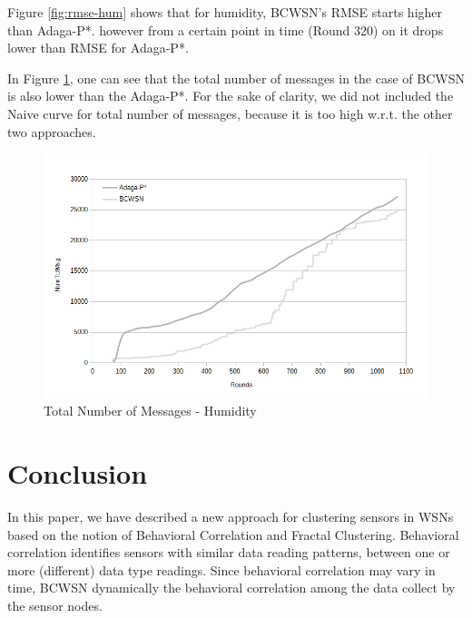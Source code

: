 \documentclass{acm_proc_article-sp}
\begin{document}
Figure \ref{fig:rmse-hum} shows that for 
humidity, BCWSN's RMSE  starts higher than Adaga-P*. however from a certain 
point in time (Round 320) on it drops lower than RMSE for Adaga-P*.

In Figure \ref{fig:tot-num-msg-hum}, one can see that the total number of messages 
in the case of BCWSN is also lower than the Adaga-P*. For the sake of clarity, we did not included the Naive curve for total number of messages, because it is too high w.r.t. the other two approaches. 

\begin{figure}[!htb]
\begin{center}
	\includegraphics[scale=0.4]{BCWSN-TotNumMsgxRound-PB-2Appr-Hum.png}
	 \vspace*{-.6cm}
    \caption{Total Number of Messages - Humidity}
    \label{fig:tot-num-msg-hum}
\end{center}
\end{figure}
\vspace*{-.3cm}

\section{Conclusion}
\label{conclusion}

In this paper, we have described a new approach for clustering sensors in WSNs
based on the notion of Behavioral Correlation and Fractal Clustering.
Behavioral correlation identifies sensors with similar data reading patterns,
between one or more (different) data type readings. Since behavioral correlation may vary in time,  BCWSN dynamically the behavioral correlation among the data collect by the sensor nodes.
\vspace*{-.3cm}
\end{document}

